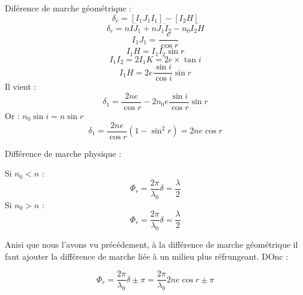 \documentclass[a4paper,12pt]{article}
\theoremstyle{StyleTheo_will}
\theoremstyle{remark}
\begin{document}
Diférence de marche géométrique :
\[\delta_r = [I_1J_1I_1] - [I_2H] \]
\[\delta_r = n\overline{IJ_1}  + n\overline{J_1I_2} - n_0\overline{I_2H}\]
\[I_1J_1 = \frac{e}{\cos r}\]
\[I_1H = I_1I_2 \sin r\]
\[I_1I_2 = 2I_1K = 2e \times \tan i\]
\[I_1H = 2e \frac{\sin i}{\cos i} \sin r\]
Il vient : 
\[\delta_1 = \frac{2ne}{\cos r} - 2n_0e\frac{\sin i}{\cos r}\sin r\]
Or : $n_0 \sin i = n \sin r$
\[\delta_1 = \frac{2ne}{\cos r} (1- \sin^2 r) = 2ne \cos r\]

Différence de marche physique :

Si $n_0<n$ : \[ \varPhi_r = \frac{2\pi}{\lambda_0}\delta = \frac{\lambda}{2}\]
Si $n_0>n$ : \[ \varPhi_r = \frac{2\pi}{\lambda_0}\delta = \frac{\lambda}{2}\]

Anisi que nous l'avons vu précédement, à la différence de marche géométrique il faut ajouter la différence de marche liée à un milieu plus réfrungeant. DOnc :

\[\varPhi_r = \frac{2\pi}{\lambda_0}\delta \pm \pi= \frac{2\pi}{\lambda_0}2ne \cos r \pm \pi\]
\end{document}
